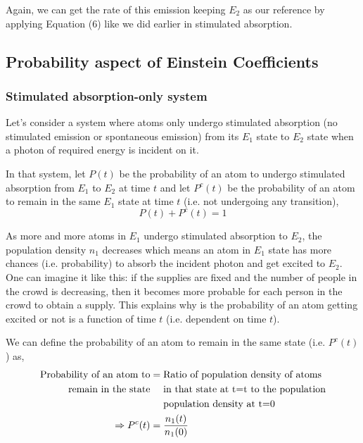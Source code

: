 \documentclass[12pt]{article}
\begin{document}
Again, we can get the rate of this emission keeping $E_{2}$ as our reference by applying Equation (6) like we did earlier in stimulated absorption.

\subsection{Probability aspect of Einstein Coefficients}

\subsubsection{Stimulated absorption-only system}

Let's consider a system where atoms only undergo stimulated absorption (no stimulated emission or spontaneous emission) from its $E_{1}$ state to $E_{2}$ state when a photon of required energy is incident on it. \vspace{.2cm}

In that system, let $P(t)$ be the probability of an atom to undergo stimulated absorption from $E_{1}$ to $E_{2}$ at time $t$ and let $P^c(t)$ be the probability of an atom to remain in the same $E_{1}$ state at time $t$ (i.e. not undergoing any transition), \vspace{.2cm}
\begin{equation}
    P(t) + P^c(t) = 1
\end{equation}

As more and more atoms in $E_{1}$ undergo stimulated absorption to $E_{2}$, the population density $n_{1}$ decreases which means an atom in $E_{1}$ state has more chances (i.e. probability) to absorb the incident photon and get excited to $E_{2}$. One can imagine it like this: if the supplies are fixed and the number of people in the crowd is decreasing, then it becomes more probable for each person in the crowd to obtain a supply. This explains why is the probability of an atom getting excited or not is a function of time $t$ (i.e. dependent on time $t$). \vspace{.2cm}

We can define the probability of an atom to remain in the same state (i.e. $P^c(t)$) as,
\begin{align}
    \text{Probability of an atom to} & = \text{Ratio of population density of atoms} \notag \\
    \text{remain in the state} & \quad \text{  in that state at t=t to the population} \notag \\
    & \quad \text{  population density at t=0} \notag \\
    \Rightarrow P^c(t) & = \frac{n_{1}(t)}{n_{1}(0)} 
\end{align}
\end{document}
